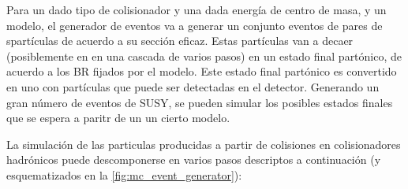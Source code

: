 Para un dado tipo de colisionador y una dada energía de centro de masa, y un
modelo, el generador de eventos va a generar un conjunto eventos de pares de
spartículas de acuerdo a su sección eficaz. Estas partículas van a decaer
(posiblemente en en una cascada de varios pasos) en un estado final partónico,
de acuerdo a los BR fijados por el modelo. Este estado final partónico es
convertido en uno con partículas que puede ser detectadas en el detector.
Generando un gran número de eventos de SUSY, se pueden simular los posibles
estados finales que se espera a paritr de un un cierto modelo.

La simulación de las particulas producidas a partir de colisiones en
colisionadores hadrónicos puede descomponerse en varios pasos descriptos a
continuación (y esquematizados en la \cref{fig:mc_event_generator}):

